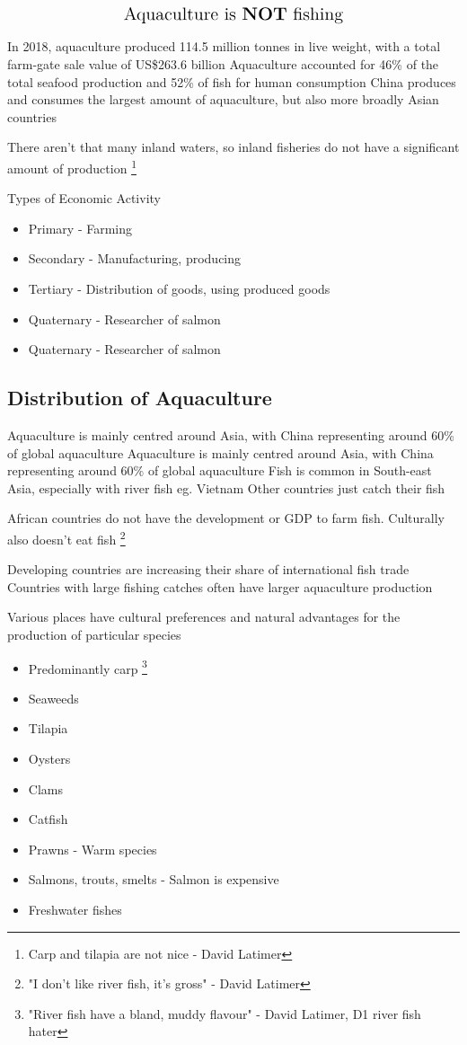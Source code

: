 	\begin{align*}
		\text{\Large Aquaculture is \textbf{NOT} fishing}
	\end{align*}

	 In 2018, aquaculture produced 114.5 million tonnes in live weight, with a total farm-gate sale value of US\$263.6 billion
	Aquaculture accounted for 46\% of the total seafood production and 52\% of fish for human consumption
	China produces and consumes the largest amount of aquaculture, but also more broadly Asian countries

	There aren't that many inland waters, so inland fisheries do not have a significant amount of production \footnote{Carp and tilapia are not nice - David Latimer}

	Types of Economic Activity
	\begin{itemize}
		\item Primary - Farming
		\item Secondary - Manufacturing, producing
		\item Tertiary - Distribution of goods, using produced goods
		\item Quaternary - Researcher of salmon
		\item Quaternary - Researcher of salmon
	\end{itemize}

	\subsection{Distribution of Aquaculture}
		Aquaculture is mainly centred around Asia, with China representing around 60\% of global aquaculture
		Aquaculture is mainly centred around Asia, with China representing around 60\% of global aquaculture
		Fish is common in South-east Asia, especially with river fish eg. Vietnam
		Other countries just catch their fish

		African countries do not have the development or GDP to farm fish. Culturally also doesn't eat fish
		\footnote{"I don't like river fish, it's gross" - David Latimer}

		Developing countries are increasing their share of international fish trade
		Countries with large fishing catches often have larger aquaculture production
		
		Various places have cultural preferences and natural advantages for the production of particular species
		\begin{itemize}
			\item Predominantly carp \footnote{"River fish have a bland, muddy flavour" - David Latimer, D1 river fish hater}
			\item Seaweeds
			\item Tilapia
			\item Oysters
			\item Clams
			\item Catfish
			\item Prawns - Warm species
			\item Salmons, trouts, smelts - Salmon is expensive
			\item Freshwater fishes
		\end{itemize}

